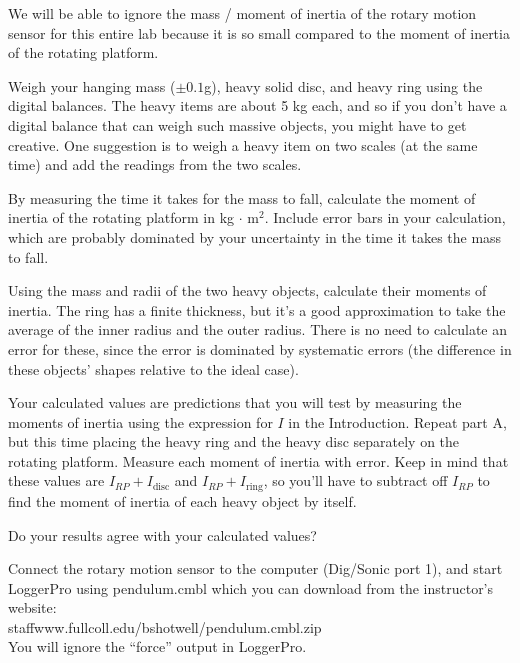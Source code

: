 We will be able to ignore the mass / moment of inertia of the rotary
motion sensor for this entire lab because it is so small compared to
the moment of inertia of the rotating platform. 

Weigh your hanging mass ($\pm0.1$g), heavy solid disc, and heavy ring
using the digital balances. The heavy items are about 5 kg each, and
so if you don't have a digital balance that can weigh such massive
objects, you might have to get creative. One suggestion is to weigh a
heavy item on two scales (at the same time) and add the readings from
the two scales. 

\observations


By measuring the time it takes for the mass to fall, calculate the
moment of inertia of the rotating platform in kg$\,\cdot\,$m$^2$.
Include error bars in your calculation, which are probably dominated
by your uncertainty in the time it takes the mass to fall. 


Using the mass and radii of the two heavy objects, calculate their
moments of inertia. The ring has a finite thickness, but it's a good
approximation to take the average of the inner radius and the outer
radius. There is no need to calculate an error for these, since the
error is dominated by systematic errors (the difference in these
objects' shapes relative to the ideal case). 

Your calculated values are predictions that you will test by measuring
the moments of inertia using the expression for $I$ in the
Introduction. Repeat part A, but this time placing the heavy ring and
the heavy disc separately on the rotating platform. Measure each
moment of inertia with error. Keep in mind that these values are
$I_{RP} + I_\text{disc}$ and $I_{RP} + I_\text{ring}$, so you'll have
to subtract off $I_{RP}$ to find the moment of inertia of each heavy
object by itself. 

Do your results agree with your calculated values?


Connect the rotary motion sensor to the computer (Dig/Sonic port 1),
and start LoggerPro using pendulum.cmbl which you can download from
the instructor's website:\\
staffwww.fullcoll.edu/bshotwell/pendulum.cmbl.zip\\ 
You will ignore the ``force'' output in LoggerPro. 

